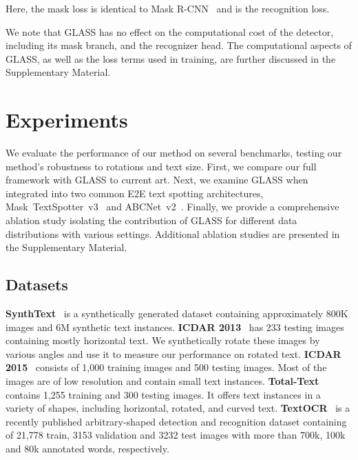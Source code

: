 \documentclass[runningheads]{llncs}
\begin{document}
Here, the mask loss  is identical to Mask R-CNN~\cite{he2017mask} and  is the recognition loss.

We note that GLASS has no effect on the computational cost of the detector, including its mask branch, and the recognizer head.
The computational aspects of GLASS, as well as the loss terms used in training, are further discussed in the Supplementary Material.

%
 
\section{Experiments}
\label{sec:experiments}

We evaluate the performance of our method on several benchmarks, testing our method's robustness to rotations and text size.
First, we compare our full framework with GLASS to current art.
Next, we examine GLASS when integrated into two common E2E text spotting architectures, Mask~TextSpotter~v3~\cite{liao2020spotterV3} and ABCNet~v2~\cite{liu2021abcnetV2}.
Finally, we provide a comprehensive ablation study isolating the contribution of GLASS for different data distributions with various settings.
Additional ablation studies are presented in the Supplementary Material.

\subsection{Datasets}
\label{sec:datasets}
\textbf{SynthText}~\cite{gupta2016synthetic} is a synthetically generated dataset containing approximately 800K images and 6M synthetic text instances.
\textbf{ICDAR 2013}~\cite{karatzas2013icdar} has 233 testing images containing mostly horizontal text. We synthetically rotate these images by various angles and use it to measure our performance on rotated text.
\textbf{ICDAR 2015}~\cite{karatzas2015icdar} consists of 1,000 training images and 500 testing images.
Most of the images are of low resolution and contain small text instances.
\textbf{Total-Text}~\cite{ch2017total} contains 1,255 training and 300 testing images.
It offers text instances in a variety of shapes, including horizontal, rotated, and curved text. 
\textbf{TextOCR}~\cite{singh2021textocr} is a recently published arbitrary-shaped detection and recognition dataset containing of 21,778 train, 3153 validation and 3232 test images with more than 700k, 100k and 80k annotated words, respectively. 
\end{document}
